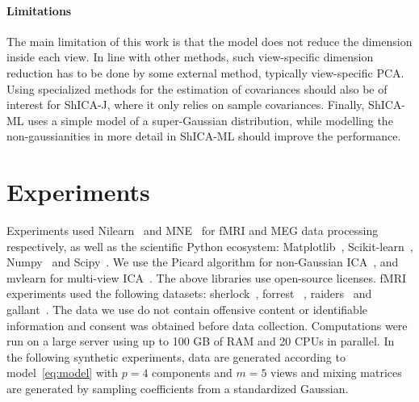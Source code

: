 \documentclass[12pt]{report}
\begin{document}
\paragraph{Limitations}
The main limitation of this work is that the model does not reduce the dimension inside each view. In line with other methods, such view-specific  dimension reduction has to be done by some external method, typically view-specific PCA. Using specialized methods for the estimation of covariances should also be of interest for ShICA-J, where it only relies on sample covariances. Finally, ShICA-ML uses a simple model of a super-Gaussian distribution, while modelling the non-gaussianities in more detail in ShICA-ML should improve the performance.

\section{Experiments}
Experiments used Nilearn~\cite{abraham2014machine} and MNE~\cite{gramfort2013meg} for fMRI and MEG data
processing respectively, as well as the scientific Python ecosystem:
Matplotlib~\cite{hunter2007matplotlib}, Scikit-learn~\cite{pedregosa2011scikit},
Numpy~\cite{harris2020array} and Scipy~\cite{2020SciPy-NMeth}. We use the Picard algorithm for non-Gaussian ICA~\cite{ablin2018faster}, and mvlearn for multi-view ICA~\cite{perry2020mvlearn}. The above libraries use open-source licenses. fMRI experiments used the following datasets: sherlock~\cite{chen2017shared}, forrest~\cite{hanke2014high} , raiders~\cite{ibc} and gallant~\cite{ibc}. The data we use do not contain offensive content or identifiable information and consent was obtained before data collection. Computations were run on a large server using up to 100 GB of RAM and 20 CPUs in parallel.
%
In the following synthetic experiments, data are generated according to model~\eqref{eq:model} with $p=4$ components and $m=5$ views and mixing matrices are generated by sampling coefficients from a standardized Gaussian.
\end{document}
